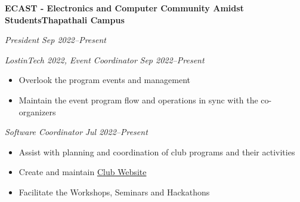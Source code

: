 \textbf{ECAST - Electronics and Computer Community Amidst Students\hfill Thapathali Campus}\par

\textit{President} \hfill \textit{Sep 2022--Present}

\textit{LostinTech 2022, Event Coordinator} \hfill \textit{Sep 2022--Present}
\begin{itemize}
	\item Overlook the program events and management
	\item Maintain the event program flow and operations in sync with the co-organizers
\end{itemize}\par

\textit{Software Coordinator} \hfill \textit{Jul 2022--Present}
\begin{itemize}
	\item Assist with planning and coordination of club programs and their activities
	\item Create and maintain \href{https://www.ecast.tech/}{Club Website}
	\item Facilitate the Workshops, Seminars and Hackathons
\end{itemize}\par